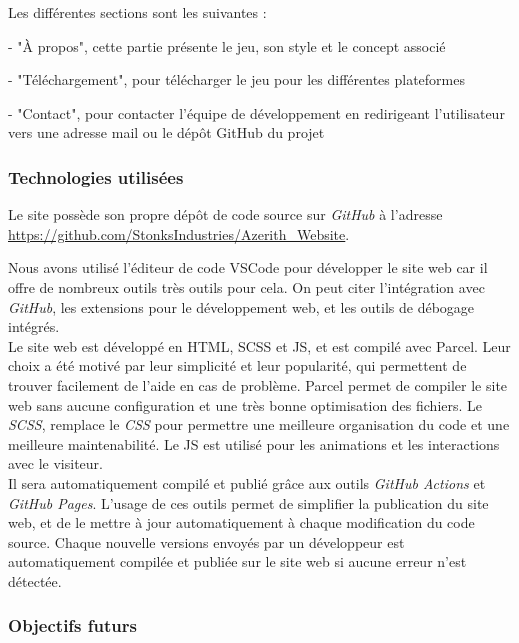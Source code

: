 Les différentes sections sont les suivantes :

- "À propos", cette partie présente le jeu, son style et le concept associé

- "Téléchargement", pour télécharger le jeu pour les différentes plateformes

- "Contact", pour contacter l'équipe de développement en redirigeant l'utilisateur vers une adresse mail ou le dépôt GitHub du projet


\subsubsection*{\hspace*{0.6cm}Technologies utilisées}

Le site possède son propre dépôt de code source sur \textit{GitHub} à l'adresse \url{https://github.com/StonksIndustries/Azerith_Website}. 

Nous avons utilisé l'éditeur de code VSCode pour développer le site web car il offre de nombreux outils très outils pour cela. On peut citer l'intégration avec \textit{GitHub}, les extensions pour le développement web, et les outils de débogage intégrés.
\\

Le site web est développé en HTML, SCSS et JS, et est compilé avec Parcel. 
Leur choix a été motivé par leur simplicité et leur popularité, qui permettent de trouver facilement de l'aide en cas de problème. 
Parcel permet de compiler le site web sans aucune configuration et une très bonne optimisation des fichiers. 
Le \textit{SCSS}, remplace le \textit{CSS} pour permettre une meilleure organisation du code et une meilleure maintenabilité. 
Le JS est utilisé pour les animations et les interactions avec le visiteur.
\\

Il sera automatiquement compilé et publié grâce aux outils \textit{GitHub Actions} et \textit{GitHub Pages}. 
L'usage de ces outils permet de simplifier la publication du site web, et de le mettre à jour automatiquement à chaque modification du code source. 
Chaque nouvelle versions envoyés par un développeur est automatiquement compilée et publiée sur le site web si aucune erreur n'est détectée.

\subsubsection*{\hspace*{0.6cm}Objectifs futurs}

